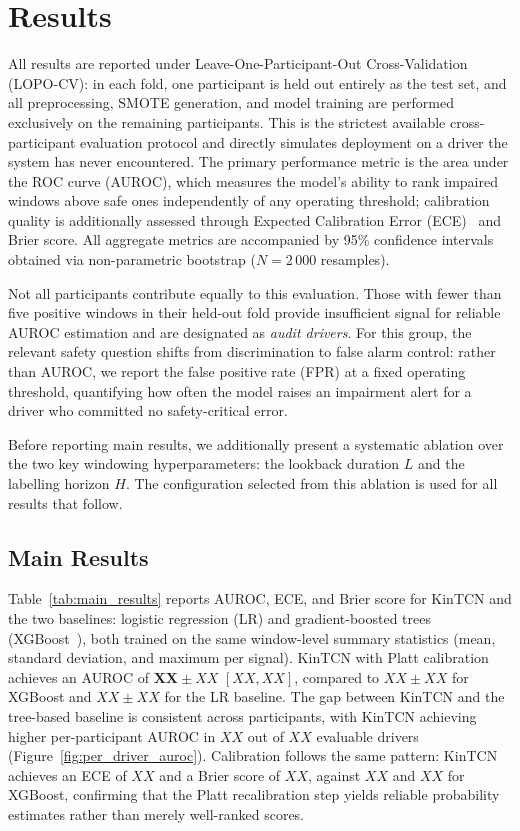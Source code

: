 \section{Results}
\label{sec:results}

All results are reported under Leave-One-Participant-Out Cross-Validation
(LOPO-CV): in each fold, one participant is held out entirely as the test set,
and all preprocessing, SMOTE generation, and model training are performed
exclusively on the remaining participants.
This is the strictest available cross-participant evaluation protocol and
directly simulates deployment on a driver the system has never encountered.
The primary performance metric is the area under the ROC curve (AUROC), which
measures the model's ability to rank impaired windows above safe ones
independently of any operating threshold; calibration quality is additionally
assessed through Expected Calibration Error (ECE)~\cite{Guo2017} and Brier
score.
All aggregate metrics are accompanied by 95\% confidence intervals obtained
via non-parametric bootstrap ($N = 2\,000$ resamples).

Not all participants contribute equally to this evaluation.
Those with fewer than five positive windows in their held-out fold provide
insufficient signal for reliable AUROC estimation and are designated as
\emph{audit drivers}.
For this group, the relevant safety question shifts from discrimination to false
alarm control: rather than AUROC, we report the false positive rate (FPR) at a
fixed operating threshold, quantifying how often the model raises an impairment
alert for a driver who committed no safety-critical error.

Before reporting main results, we additionally present a systematic ablation
over the two key windowing hyperparameters: the lookback duration $L$ and the
labelling horizon $H$.
The configuration selected from this ablation is used for all results that
follow.

\subsection{Main Results}

Table~\ref{tab:main_results} reports AUROC, ECE, and Brier score for KinTCN
and the two baselines: logistic regression (LR) and gradient-boosted trees
(XGBoost~\cite{Chen2016}), both trained on the same window-level summary
statistics (mean, standard deviation, and maximum per signal).
KinTCN with Platt calibration achieves an AUROC of
$\mathbf{XX} \pm XX$ $[XX, XX]$, compared to $XX \pm XX$ for XGBoost and
$XX \pm XX$ for the LR baseline.
The gap between KinTCN and the tree-based baseline is consistent
across participants, with KinTCN achieving higher per-participant AUROC in
$XX$ out of $XX$ evaluable drivers (Figure~\ref{fig:per_driver_auroc}).
Calibration follows the same pattern: KinTCN achieves an ECE of $XX$
and a Brier score of $XX$, against $XX$ and $XX$ for XGBoost,
confirming that the Platt recalibration step yields reliable probability
estimates rather than merely well-ranked scores.


